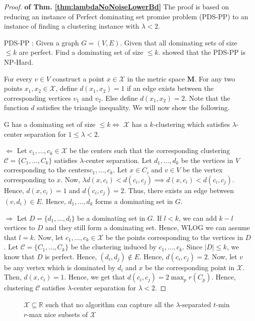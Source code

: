 \documentclass[anon,12pt]{colt2016} %
\newcommand{\mc}{\mathcal}
\newcommand{\mb}{\mathbf}
\begin{document}
\begin{proof}\textbf{ of Thm. \ref{thm:lambdaNoNoiseLowerBd}}
The proof is based on reducing an instance of Perfect dominating set promise problem (PDS-PP) to an instance of finding a clustering instance with $\lambda < 2$.

PDS-PP : Given a graph $G = (V, E)$. Given that all dominating sets of size $\le k$ are perfect. Find a dominating set of size $\le k$. \cite{reyzin2012data} showed that the PDS-PP is NP-Hard. 

For every $v \in V$ construct a point $x \in \mc X$ in the metric space $\mb M$. For any two points $x_1, x_2 \in \mc X$, define $d(x_1, x_2) = 1$ if an edge exists between the corresponding vertices $v_1$ and $v_2$. Else define $d(x_1, x_2) = 2$. Note that the function $d$ satisfies the triangle inequality. We will now show the following.

G has a dominating set of size $\le k \iff$ $\mc X$ has a $k$-clustering which satisfies $\lambda$-center separation for $1 \le \lambda < 2$.

$\Leftarrow$  Let $c_1, \ldots, c_k \in \mc X$ be the centers such that the corresponding clustering $\mc C = \{C_1, \ldots, C_k\}$ satisfies $\lambda$-center separation. Let $d_1, \ldots, d_k$ be the vertices in $V$ corresponding to the centers$c_1, \ldots, c_k$. Let $x \in C_i$ and $v \in V$ be the vertex corresponding to $x$. Now, $\lambda d(x, c_i) < d(c_i, c_j) \implies d(x, c_i) < d(c_i, c_j)$. Hence, $d(x, c_i) = 1$ and $d(c_i, c_j) = 2$. Thus, there exists an edge between $(v, d_i) \in E$. Hence, $d_1, \ldots, d_k$ forms a dominating set in $G$.

$\Rightarrow$ Let $D = \{d_1, \ldots, d_l\}$ be a dominating set in $G$. If $l < k$, we can add $k-l$ vertices to $D$ and they still form a dominating set. Hence, WLOG we can assume that $l = k$. Now, let $c_1, \ldots, c_k \in \mc X$ be the points corresponding to the vertices in $D$. Let $\mc C = \{C_1, \ldots, C_k\}$ be the clustering induced by $c_1, \ldots, c_k$. Since $|D| \le k$, we know that $D$ is perfect. Hence, $(d_i, d_j) \not\in E$. Hence, $d(c_i, c_j) = 2$. Now, let $v$ be any vertex which is dominated by $d_i$ and $x$ be the corresponding point in $\mc X$. Then, $d(x, c_i) = 1$. Hence, we get that $d(c_i, c_j) = 2 \max_p r(C_p)$. Hence, clustering $\mc C$ satisfies $\lambda$-center separation for $\lambda < 2$.
\end{proof}

\begin{figure}

\caption{$\mc X \subseteq \mathbb{R}$ such that no algorithm can capture all the $\lambda$-separated $t$-min $r$-max nice subsets of $\mc X$}
\label{fig:nosparsealglambdacs}
\end{figure}
\end{document}

